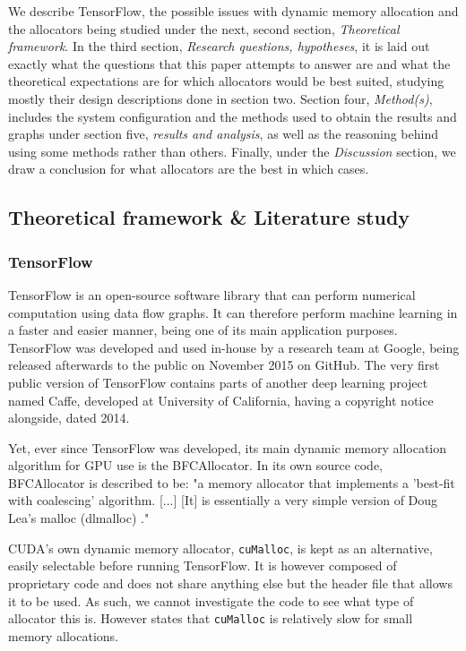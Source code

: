 \documentclass[12pt,twoside]{article}
\begin{document}
We describe TensorFlow, the possible issues with dynamic memory allocation and the allocators being studied under the next, second section, \textit{Theoretical framework}. In the third section, \textit{Research questions, hypotheses}, it is laid out exactly what the questions that this paper attempts to answer are and what the theoretical expectations are for which allocators would be best suited, studying mostly their design descriptions done in section two. Section four, \textit{Method(s)}, includes the system configuration and the methods used to obtain the results and graphs under section five, \textit{results and analysis}, as well as the reasoning behind using some methods rather than others. Finally, under the \textit{Discussion} section, we draw a conclusion for what allocators are the best in which cases.




\subsection{Theoretical framework & Literature study}
\label{sec:theoretical-framework}

\subsubsection*{TensorFlow}

TensorFlow is an open-source software library that can perform numerical computation using data flow graphs. It can therefore perform machine learning in a faster and easier manner, being one of its main application purposes. TensorFlow was developed and used in-house by a research team at Google, being released afterwards to the public on November 2015 on GitHub. The very first public version of TensorFlow contains parts of another deep learning project named Caffe, developed at University of California, having a copyright notice alongside, dated 2014.

Yet, ever since TensorFlow was developed, its main dynamic memory allocation algorithm for GPU use is the BFCAllocator. In its own source code, BFCAllocator is described to be: "a memory allocator that implements a 'best-fit with coalescing' algorithm.  [...] [It] is essentially a very simple version of Doug Lea's malloc (dlmalloc) \cite{dlmalloc}."

CUDA's own dynamic memory allocator, \texttt{cuMalloc}, is kept as an alternative, easily selectable before running TensorFlow. It is however composed of proprietary code and does not share anything else but the header file that allows it to be used. As such, we cannot investigate the code to see what type of allocator this is. However \citeauthor{Vinkler2015} states that \texttt{cuMalloc} is relatively slow for small memory allocations.
\end{document}
